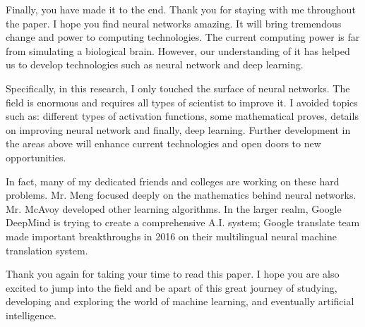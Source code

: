 \documentclass[]{article}
\begin{document}
\begin{multicols}{2}
Finally, you have made it to the end. Thank you for staying with me throughout the paper. I hope you find neural networks amazing. It will bring tremendous change and power to computing technologies. The current computing power is far from simulating a biological brain. However, our understanding of it has helped us to develop technologies such as neural network and deep learning. 

Specifically, in this research, I only touched the surface of neural networks. The field is enormous and requires all types of scientist to improve it. I avoided topics such as: different types of activation functions, some mathematical proves, details on improving neural network and finally, deep learning. Further development in the areas above will enhance current technologies and open doors to new opportunities. 

In fact, many of my dedicated friends and colleges are working on these hard problems. Mr. Meng focused deeply on the mathematics behind neural networks. Mr. McAvoy developed other learning algorithms. In the larger realm, Google DeepMind is trying to create a comprehensive A.I. system; Google translate team made important breakthroughs in 2016 on their multilingual neural machine translation system. 

Thank you again for taking your time to read this paper. I hope you are also excited to jump into the field and be apart of this great journey of studying, developing and exploring the world of machine learning, and eventually artificial intelligence. 

\end{multicols}
\end{document}
